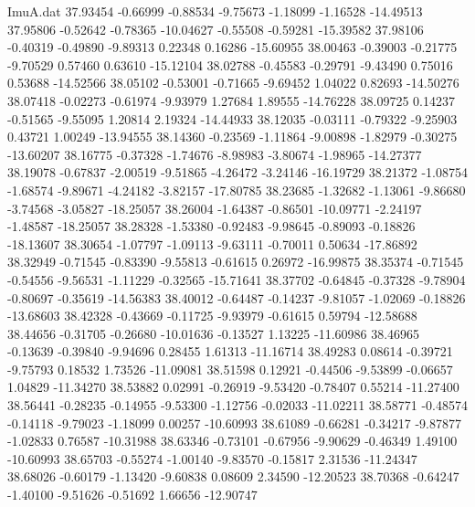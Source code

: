 \begin{filecontents}{ImuA.dat}
  37.93454   -0.66999   -0.88534   -9.75673   -1.18099   -1.16528  -14.49513
  37.95806   -0.52642   -0.78365  -10.04627   -0.55508   -0.59281  -15.39582
  37.98106   -0.40319   -0.49890   -9.89313    0.22348    0.16286  -15.60955
  38.00463   -0.39003   -0.21775   -9.70529    0.57460    0.63610  -15.12104
  38.02788   -0.45583   -0.29791   -9.43490    0.75016    0.53688  -14.52566
  38.05102   -0.53001   -0.71665   -9.69452    1.04022    0.82693  -14.50276
  38.07418   -0.02273   -0.61974   -9.93979    1.27684    1.89555  -14.76228
  38.09725    0.14237   -0.51565   -9.55095    1.20814    2.19324  -14.44933
  38.12035   -0.03111   -0.79322   -9.25903    0.43721    1.00249  -13.94555
  38.14360   -0.23569   -1.11864   -9.00898   -1.82979   -0.30275  -13.60207
  38.16775   -0.37328   -1.74676   -8.98983   -3.80674   -1.98965  -14.27377
  38.19078   -0.67837   -2.00519   -9.51865   -4.26472   -3.24146  -16.19729
  38.21372   -1.08754   -1.68574   -9.89671   -4.24182   -3.82157  -17.80785
  38.23685   -1.32682   -1.13061   -9.86680   -3.74568   -3.05827  -18.25057
  38.26004   -1.64387   -0.86501  -10.09771   -2.24197   -1.48587  -18.25057
  38.28328   -1.53380   -0.92483   -9.98645   -0.89093   -0.18826  -18.13607
  38.30654   -1.07797   -1.09113   -9.63111   -0.70011    0.50634  -17.86892
  38.32949   -0.71545   -0.83390   -9.55813   -0.61615    0.26972  -16.99875
  38.35374   -0.71545   -0.54556   -9.56531   -1.11229   -0.32565  -15.71641
  38.37702   -0.64845   -0.37328   -9.78904   -0.80697   -0.35619  -14.56383
  38.40012   -0.64487   -0.14237   -9.81057   -1.02069   -0.18826  -13.68603
  38.42328   -0.43669   -0.11725   -9.93979   -0.61615    0.59794  -12.58688
  38.44656   -0.31705   -0.26680  -10.01636   -0.13527    1.13225  -11.60986
  38.46965   -0.13639   -0.39840   -9.94696    0.28455    1.61313  -11.16714
  38.49283    0.08614   -0.39721   -9.75793    0.18532    1.73526  -11.09081
  38.51598    0.12921   -0.44506   -9.53899   -0.06657    1.04829  -11.34270
  38.53882    0.02991   -0.26919   -9.53420   -0.78407    0.55214  -11.27400
  38.56441   -0.28235   -0.14955   -9.53300   -1.12756   -0.02033  -11.02211
  38.58771   -0.48574   -0.14118   -9.79023   -1.18099    0.00257  -10.60993
  38.61089   -0.66281   -0.34217   -9.87877   -1.02833    0.76587  -10.31988
  38.63346   -0.73101   -0.67956   -9.90629   -0.46349    1.49100  -10.60993
  38.65703   -0.55274   -1.00140   -9.83570   -0.15817    2.31536  -11.24347
  38.68026   -0.60179   -1.13420   -9.60838    0.08609    2.34590  -12.20523
  38.70368   -0.64247   -1.40100   -9.51626   -0.51692    1.66656  -12.90747

\end{filecontents}
